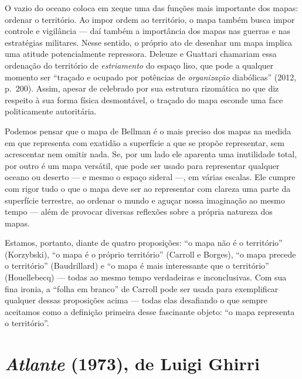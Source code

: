 O vazio do oceano coloca em xeque uma das funções mais importante dos
mapas: ordenar o território. Ao impor ordem ao território, o mapa também
busca impor controle e vigilância --- daí também a importância dos mapas
nas guerras e nas estratégias militares. Nesse sentido, o próprio ato de
desenhar um mapa implica uma atitude potencialmente repressora. Deleuze
e Guattari chamariam essa ordenação do território de \emph{estriamento}
do espaço liso, que pode a qualquer momento ser ``traçado e ocupado por
potências de \emph{organização} diabólicas'' (2012, p.~200). Assim,
apesar de celebrado por sua estrutura rizomática no que diz respeito à
sua forma física desmontável, o traçado do mapa esconde uma face
politicamente autoritária.

Podemos pensar que o mapa de Bellman é o mais preciso dos mapas na
medida em que representa com exatidão a superfície a que se propõe
representar, sem acrescentar nem omitir nada. Se, por um lado ele
aparenta uma inutilidade total, por outro é um mapa versátil, que pode
ser usado para representar qualquer oceano ou deserto --- e mesmo o
espaço sideral ---, em várias escalas. Ele cumpre com rigor tudo o que o
mapa deve ser ao representar com clareza uma parte da superfície
terrestre, ao ordenar o mundo e aguçar nossa imaginação ao mesmo tempo
--- além de provocar diversas reflexões sobre a própria natureza dos
mapas.

Estamos, portanto, diante de quatro proposições: ``o mapa não é o
território'' (Korzybski), ``o mapa é o próprio território'' (Carroll e
Borges), ``o mapa precede o território'' (Baudrillard) e ``o mapa é mais
interessante que o território'' (Houellebecq) --- todas ao mesmo tempo
verdadeiras e inconclusivas. Com sua fina ironia, a ``folha em branco''
de Carroll pode ser usada para exemplificar qualquer dessas proposições
acima --- todas elas desafiando o que sempre aceitamos como a definição
primeira desse fascinante objeto: ``o mapa representa o território''.

\chapter{\emph{Atlante} (1973), de Luigi Ghirri}

